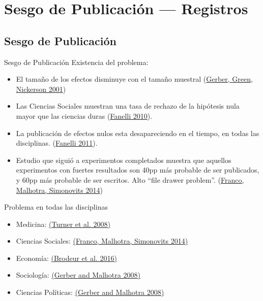 \documentclass{beamer}
\begin{document}
\section{Sesgo de Publicación --- Registros}

\subsection*{Sesgo de Publicación}
\begin{frame}{Sesgo de Publicación}%
  Existencia del problema:
  \begin{itemize}
  \item
 El tamaño de los efectos disminuye con el tamaño muestral (\href{http://pan.oxfordjournals.org/content/9/4/385.short}{Gerber, Green, Nickerson 2001})
  \item
  Las Ciencias Sociales muestran una tasa de rechazo de la hipótesis nula mayor que las ciencias duras (\href{http://journals.plos.org/plosone/article?id=10.1371/journal.pone.0010068}{Fanelli 2010}).
  \item
  La publicación de efectos nulos esta desapareciendo en el tiempo, en todas las disciplinas. (\href{http://link.springer.com/article/10.1007/s11192-011-0494-7}{Fanelli 2011}). 
  \item
  Estudio que  siguió a experimentos completados muestra que aquellos experimentos con fuertes resultados son 40pp más probable de ser publicados, y 60pp más probable de ser escritos. Alto ``file drawer problem''. (\href{http://science.sciencemag.org/content/345/6203/1502}{Franco, Malhotra, Simonovits 2014})
  \end{itemize}
\end{frame}


\begin{frame}{Problema en todas las disciplinas}
\begin{itemize}[<.->]
\item Medicina: \href{http://www.nejm.org/doi/full/10.1056/nejmsa065779}{(Turner et al. 2008)}
\item Ciencias Sociales: \href{http://science.sciencemag.org/content/345/6203/1502.short}{(Franco, Malhotra, Simonovits 2014)}
\item Economía: \href{https://www.aeaweb.org/articles.php?doi=10.1257/app.20150044}{(Brodeur et al. 2016)}
\item Sociología: \href{http://smr.sagepub.com/content/37/1/3.short}{(Gerber and Malhotra 2008)}
\item Ciencias Políticas: \href{http://nowpublishers.com/article/Details/QJPS-8024}{(Gerber and Malhotra 2008)}
\end{itemize}
\end{frame}
\end{document}
